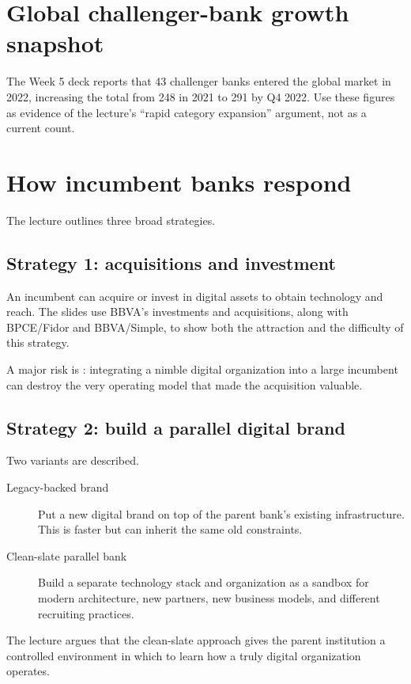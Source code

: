 \section{Global challenger-bank growth snapshot}

The Week 5 deck reports that 43 challenger banks entered the global market in 2022, increasing the total from 248 in 2021 to 291 by Q4 2022. Use these figures as evidence of the lecture's ``rapid category expansion'' argument, not as a current count.

\section{How incumbent banks respond}

The lecture outlines three broad strategies.

\subsection{Strategy 1: acquisitions and investment}

An incumbent can acquire or invest in digital assets to obtain technology and reach. The slides use BBVA's investments and acquisitions, along with BPCE/Fidor and BBVA/Simple, to show both the attraction and the difficulty of this strategy.

A major risk is : integrating a nimble digital organization into a large incumbent can destroy the very operating model that made the acquisition valuable.

\subsection{Strategy 2: build a parallel digital brand}

Two variants are described.

\begin{description}
  \item[Legacy-backed brand] Put a new digital brand on top of the parent bank's existing infrastructure. This is faster but can inherit the same old constraints.
  \item[Clean-slate parallel bank] Build a separate technology stack and organization as a sandbox for modern architecture, new partners, new business models, and different recruiting practices.
\end{description}

The lecture argues that the clean-slate approach gives the parent institution a controlled environment in which to learn how a truly digital organization operates.

